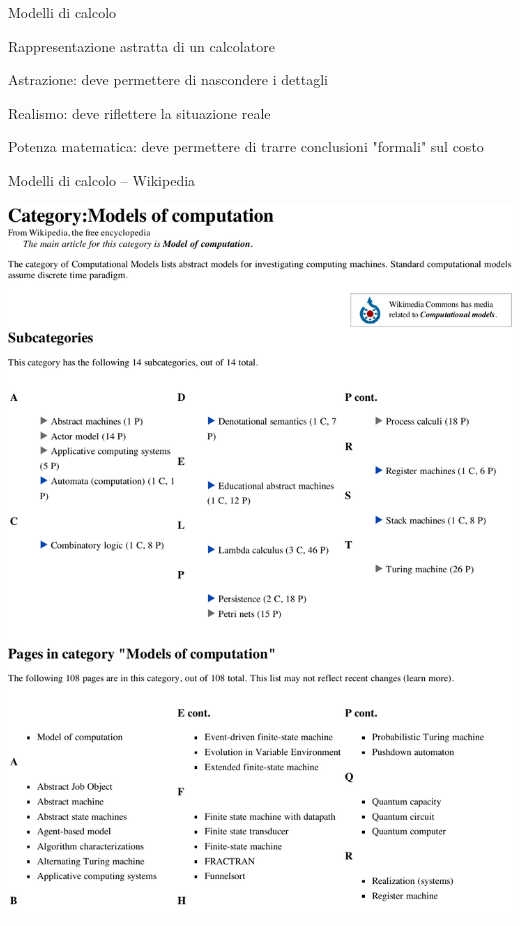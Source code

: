 \begin{frame}{Modelli di calcolo}

\vspace{-9pt}
\begin{myboxtitle}
Rappresentazione astratta di un calcolatore
\BI
\item \alert{Astrazione}: deve permettere di nascondere i dettagli
\item \alert{Realismo}: deve riflettere la situazione reale
\item \alert{Potenza matematica}: deve permettere di trarre conclusioni "formali" sul costo
\EI
\end{myboxtitle}
\end{frame}


\begin{frame}{Modelli di calcolo -- Wikipedia}

\includegraphics[width=\textwidth]{models.pdf}

\end{frame}

